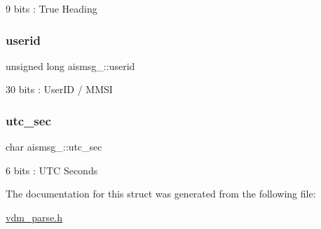 9 bits \+: True Heading 

\mbox{\label{structaismsg__19_adf5369af8d06a58277974b7dabbda529}} 
\subsubsection{\texorpdfstring{userid}{userid}}
{\footnotesize\ttfamily unsigned long aismsg\+\_\+::userid}



30 bits \+: User\+ID / M\+M\+SI 

\mbox{\label{structaismsg__19_a3f6d4d190a93ec0c33318ca8d8c8ff5c}} 
\subsubsection{\texorpdfstring{utc\+\_\+sec}{utc\_sec}}
{\footnotesize\ttfamily char aismsg\+\_\+::utc\+\_\+sec}



6 bits \+: U\+TC Seconds 



The documentation for this struct was generated from the following file\+:\begin{DoxyCompactItemize}
\item 
\mbox{\hyperlink{vdm__parse_8h}{vdm\+\_\+parse.\+h}}\end{DoxyCompactItemize}
